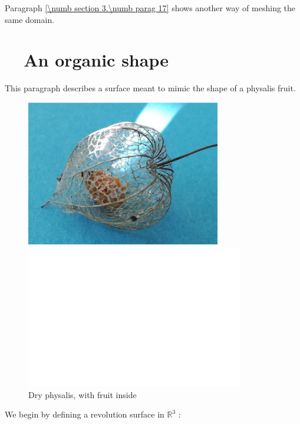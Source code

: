 Paragraph \ref{\numb section 3.\numb parag 17} shows another way of meshing the same domain.


\section{~~An organic shape}\label{\numb section 2.\numb parag 11}

This paragraph describes a surface meant to mimic the shape of a physalis fruit.


\begin{figure}[ht]\centering
\if{}
\centerline{\includegraphics[width=85mm]{dry-physalis}}
\else
{}
\centerline{\includegraphics[width=95mm]{fake-physalis}}
\fi
  \caption{Dry physalis, with fruit inside}\label{\numb section 2.\numb fig 11}
\end{figure}

We begin by defining a revolution surface in $ \mathbb{R}^3 $ :

